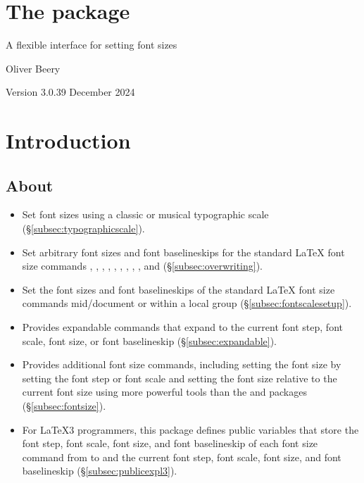 \documentclass{beery}
\begin{document}
\section*
  {%
    The  package%
  }

A flexible interface for setting font sizes

Oliver Beery

Version 3.0.3\quad{}9 December 2024


\section{Introduction}
\label{sec:intro}

\subsection{About}
\label{subsec:about}

\begin{itemize}
  \item
  Set font sizes using a classic or musical typographic scale (\S\ref{subsec:typographicscale}).
  \item
  Set arbitrary font sizes and font baselineskips for the standard \LaTeX{} font size commands , , , , , , , , , and  (\S\ref{subsec:overwriting}).
  \item
  Set the font sizes and font baselineskips of the standard \LaTeX{} font size commands mid\-/document or within a local group (\S\ref{subsec:fontscalesetup}).
  \item
  Provides expandable commands that expand to the current font step, font scale, font size, or font baselineskip (\S\ref{subsec:expandable}).
  \item
  Provides additional font size commands, including setting the font size by setting the font step or font scale and setting the font size relative to the current font size using more powerful tools than the  and  packages (\S\ref{subsec:fontsize}).
  \item
  For \LaTeX3 programmers, this package defines public  variables that store the font step, font scale, font size, and font baselineskip of each font size command from  to  and the current font step, font scale, font size, and font baselineskip (\S\ref{subsec:publicexpl3}).
\end{itemize}
\end{document}
